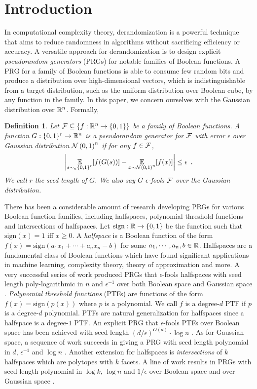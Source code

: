 \documentclass[12pt]{article}
\newtheorem{definition}[theorem]{Definition}
\newcommand{\sign}[1]{\mathrm{sign}\!\br{#1}}
\newcommand{\br}[1]{\left(#1\right)} \newcommand{\Br}[1]{\left[#1\right]} \newcommand{\st}[1]{\left\{#1\right\}} \newcommand{\tr}[1]{\mathrm{Tr}\!\Br{#1}} \newcommand{\abs}[1]{\left|#1 \right|} \newcommand{\norm}[1]{\left\lVert #1 \right\rVert} \newcommand{\agl}[2]{\theta^{\br{#1}}_{#2}} \newcommand{\aglp}[2]{{\theta'}^{\br{#1}}_{#2}} \newcommand{\lint}[1]{\left\lfloor#1\right\rfloor} \newcommand{\poly}[1]{\mathrm{poly}\!\br{#1}} \newcommand{\negl}[1]{\mathrm{negl}\!\br{#1}} \newcommand{\de}[1]{\mathrm{d}#1} \newcommand{\val}[1]{\mathrm{val}\!\br{#1}} \newcommand{\vall}[1]{\mathrm{val}\br{#1}} \newcommand{\nd}[1]{\mathcal{N}\!\br{#1}} \newcommand{\ketbratwo}[2]{\ket{#1} \hspace{-0.4em}\bra{#2}} \newcommand{\ketbra}[1]{\ketbratwo{#1}{#1}} \newcommand{\id}{\ensuremath{\mathds{1}}} \newcommand{\ogroup}[1]{\mathrm{O}\!\br{#1}} \newcommand{\ugroup}[1]{\mathrm{U}\!\br{#1}} \newcommand{\td}{\mathrm{TD}} \newcommand{\tv}[1]{\norm{#1}_{\mathrm{TV}}} \newcommand {\defeq} {\ensuremath{ \stackrel{\mathrm{def}}{=} }} \newcommand{\vdim}{\ensuremath{N}} \newcommand{\dimin}{\ensuremath{n}} \newcommand{\dimout}{\ensuremath{m}} \newcommand{\ncopy}{\ell} \newcommand{\hspacein}{\H_\mathrm{in}} \newcommand{\hspaceout}{\H_\mathrm{out}} \newcommand{\Sin}{\S(\hspacein)} \newcommand{\Sout}{\S(\hspaceout)} \newcommand{\haar}{\ensuremath{\mu}} \newcommand{\tensorhaar}{\ensuremath{\eta}} \newcommand{\tensorsrss}{\ensuremath{\nu}} \newcommand{\qadvice}{\ensuremath{\rho}} \newcommand{\tp}{\otimes} \newcommand{\wone}[2]{W_1\!\br{#1,#2}}
\begin{document}
\section{Introduction}
\label{sec:intro}
In computational complexity theory,
derandomization is a powerful technique that aims to
reduce randomness in algorithms without sacrificing efficiency or accuracy.
A versatile approach for derandomization is to design explicit \emph{pseudorandom generators} (PRGs) for notable families of Boolean functions.
A PRG for a family of Boolean functions is able to consume few random bits
and produce a distribution over high-dimensional vectors,
which is indistinguishable from a target distribution, such as the uniform distribution over Boolean cube, by any function in the family. In this paper, we concern ourselves with the Gaussian distribution over $\mathbb{R}^n$.
Formally,
\begin{definition}
	Let $\F\subseteq\st{f:\R^n \to \{0,1\}}$ be a family of Boolean functions.
	A function $G:\{0,1\}^r \to \mathbb{R}^n$ is a pseudorandom generator for $\mathcal{F}$ with error $\epsilon$ over Gaussian distribution $\NN\br{0,1}^n$ if for any $f\in\mathcal{F}$,
	\[
		\abs{ \expect{s\sim_u\st{0,1}^r}{f(G(s))} 
		 - \expect{x\sim\NN\br{0,1}^n}{f(x)}		
		} \leq \epsilon \enspace. 
	\]
	We call $r$ the seed length of $G$. We also say $G$ $\epsilon$-fools $\mathcal{F}$ over the Gaussian distribution.
\end{definition}

There has been a considerable amount of research
developing PRGs for various Boolean function families,
including halfspaces, polynomial threshold functions and intersections of halfspaces.
Let $\mathrm{sign}:\R\to\st{0,1}$ be the function such that $\sign{x}=1$ iff $x\geq0$.
A \emph{halfspace} is a Boolean function of the form $f(x) = \sign{a_1x_1+\cdots+a_nx_n-b}$ for some $a_1,\cdots,a_n,b\in\mathbb{R}$.
Halfspaces are a fundamental class of Boolean functions which have found significant applications in machine learning, complexity theory, theory of approximation and more.
A very successful series of work produced PRGs that $\epsilon$-fools halfspaces with seed length poly-logarithmic in $n$ and $\epsilon^{-1}$ over both Boolean space \cite{Ser06, DGJ+10, MZ13, GKM18} and Gaussian space \cite{KM15}.
\emph{Polynomial threshold functions} (PTFs) are functions of the form $f(x) = \sign{p(x)}$ where $p$ is a polynomial. We call $f$ is a degree-$d$ PTF if $p$ is a degree-$d$ polynomial. PTFs are natural generalization for halfspaces since a halfspace is a degree-$1$ PTF.
An explicit PRG that $\epsilon$-fools PTFs over Boolean space has been achieved with seed length
$ (d/\epsilon)^{O(d)}\cdot\log n $ \cite{MZ13}.
As for Gaussian space, a sequence of work \cite{DKN10, Kan11a, Kan11b, Kan12, MZ13, Kan14, Kan15, OST20, KM22} succeeds in giving a PRG with seed length polynomial in $d$, $\epsilon^{-1}$ and $\log n$ \cite{OST20, KM22}.
Another extension for halfspaces is \emph{intersections} of $k$ halfspaces
which are polytopes with $k$ facets.
A line of work \cite{GOWZ10, HKM13, ST17, CDS19, OST22} results in PRGs with seed length polynomial in $\log k$, $\log n$ and $1/\epsilon$ over Boolean space \cite{OST22} and over Gaussian space \cite{CDS19}.
\end{document}
